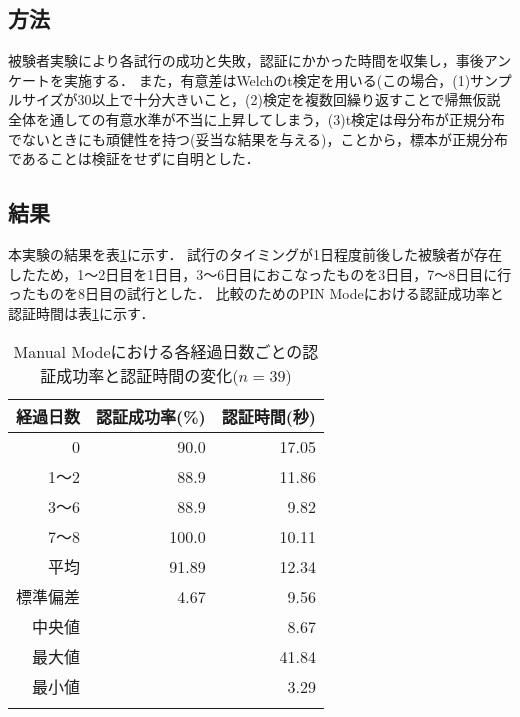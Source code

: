 \subsection{方法}
被験者実験により各試行の成功と失敗，認証にかかった時間を収集し，事後アンケートを実施する．
また，有意差はWelchのt検定を用いる(この場合，(1)サンプルサイズが30以上で十分大きいこと，(2)検定を複数回繰り返すことで帰無仮説全体を通しての有意水準が不当に上昇してしまう，(3)t検定は母分布が正規分布でないときにも頑健性を持つ(妥当な結果を与える)，ことから，標本が正規分布であることは検証をせずに自明とした．

\subsection{結果}
本実験の結果を表\ref{tab:manual.data}に示す．
試行のタイミングが1日程度前後した被験者が存在したため，1〜2日目を1日目，3〜6日目におこなったものを3日目，7〜8日目に行ったものを8日目の試行とした．
比較のためのPIN Modeにおける認証成功率と認証時間は表\ref{tab:manual.data}に示す．

\begin{table}[t]
  \caption{Manual Modeにおける各経過日数ごとの認証成功率と認証時間の変化($ n = 39 $)}
  \label{tab:manual.data}
  \begin{center}
    \small
    \begin{tabular}{rrr}
      \bhline
      経過日数 & 認証成功率(\%) & 認証時間(秒)\\ \hline
      0 & 90.0 & 17.05 \\
      1〜2 & 88.9 & 11.86 \\
      3〜6 & 88.9 & 9.82 \\
      7〜8 & 100.0 & 10.11 \\ \hline \hline
      平均 & 91.89 & 12.34 \\
      標準偏差 & 4.67 & 9.56 \\
      中央値 & & 8.67 \\
      最大値 & & 41.84 \\
      最小値 & & 3.29 \\
      \bhline
    \end{tabular}
  \end{center}
\end{table}

